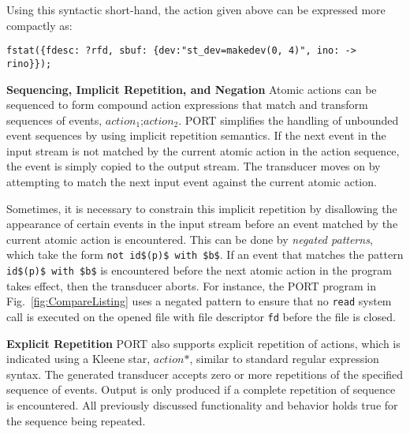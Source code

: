 \begin{adjustbox}{max width=\textwidth}
Using this syntactic short-hand, the action given above can be expressed more compactly as:
\begin{lstlisting}[numbers=none,xleftmargin=0em,gobble=2]
  fstat({fdesc: ?rfd, sbuf: {dev:"st_dev=makedev(0, 4)", ino: -> rino}});
\end{lstlisting}


\noindent\textbf{Sequencing, Implicit Repetition, and Negation}
Atomic actions can be sequenced to form compound action expressions that match and transform sequences of events, $\mathit{action}_1 \texttt{;} \mathit{action}_2$. PORT simplifies the handling of unbounded event sequences by using implicit repetition semantics.
If the next event in the input stream is not matched by the current atomic action in the action sequence, the event is simply copied to the output stream. The transducer moves on by attempting to match the next input event against the current atomic action.

Sometimes, it is necessary to constrain this implicit repetition by disallowing the appearance of certain events in the input stream before an event  matched by the current atomic action is encountered.  This can be done by \emph{negated patterns}, which take the form \lstinline+not id$(p)$ with $b$+. If an event that matches the pattern \lstinline+id$(p)$ with $b$+ is encountered before the next atomic action in the program takes effect, then the transducer aborts. For instance, the PORT program in Fig.~\ref{fig:CompareListing} uses a negated pattern to ensure that no \lstinline+read+ system call is executed on the opened file with file descriptor \lstinline+fd+ before the file is closed.

\noindent\textbf{Explicit Repetition}
PORT also supports explicit repetition of actions, which is indicated using a Kleene star, $\mathit{action}\texttt{*}$, similar to standard regular expression syntax.
The generated transducer accepts zero or more repetitions of the specified sequence of events.
Output is only produced if a complete repetition of sequence is encountered.
All previously discussed functionality and behavior holds true for the sequence being repeated.


\end{adjustbox}
